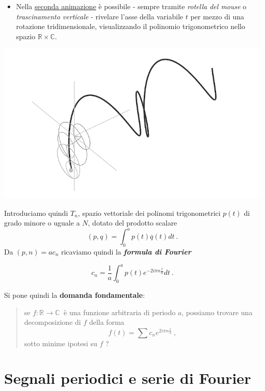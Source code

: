 \documentclass[
]{book}
\providecommand{\tightlist}{%
  \setlength{\itemsep}{0pt}\setlength{\parskip}{0pt}}
\begin{document}
\begin{itemize}
\tightlist
\item
  Nella \href{https://bradwave.github.io/thesis/animations/s3-animation.html}{seconda animazione} è possibile - sempre tramite \emph{rotella del mouse} o \emph{trascinamento verticale} - rivelare l'asse della variabile \(t\) per mezzo di una rotazione tridimensionale, visualizzando il polinomio trigonometrico nello spazio \(\mathbb{R} \times \mathbb{C}\).
\end{itemize}

\begin{center}\includegraphics[width=0.5\linewidth]{_images/pol-3d} \end{center}

Introduciamo quindi \(T_n\), spazio vettoriale dei polinomi trigonometrici \(p(t)\) di grado minore o uguale a \(N\), dotato del prodotto scalare
\[(p,q) = \int_{0}^{a} p(t) \overline{q}(t)dt \ .\]
Da \((p,n)=ac_n\) ricaviamo quindi la \emph{\textbf{formula di Fourier}}

\begin{equation}
  c_n=\frac{1}{a} \int_{0}^{a}p(t)e^{-2 i \pi n \textstyle \frac {t}{a}}dt \ .
  \label{eq:formulafourier}
\end{equation}

Si pone quindi la \textbf{domanda fondamentale}:

\begin{quote}
se \(f: \mathbb{R} \longrightarrow \mathbb{C} \ \) è una funzione arbitraria di periodo \(a\), possiamo trovare una decomposizione di \(f\) della forma
\begin{equation}
f(t) = \sum c_n e^{2i \pi n\textstyle \frac{t}{a}} \ ,
\label{eq:domanda}
\end{equation}
sotto minime ipotesi su \(f\) ?
\end{quote}

\hypertarget{seriefourier}{%
\section{Segnali periodici e serie di Fourier}\label{seriefourier}}
\end{document}

